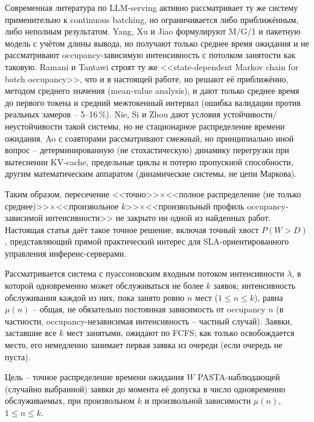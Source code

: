 \documentclass[12pt,a4paper]{article}
\newcommand{\articlesection}[1]{\par\vspace{14pt}{\bfseries #1}\par\vspace{6pt}\nopagebreak}
\begin{document}
Современная литература по LLM-serving активно рассматривает ту же систему применительно к continuous batching, но ограничивается либо приближённым, либо неполным результатом. Yang, Xu и Jiao \cite{yang2024} формулируют M/G/1 и пакетную модель с учётом длины вывода, но получают только среднее время ожидания и не рассматривают occupancy-зависимую интенсивность с потолком занятости как таковую. Ramani и Tantawi \cite{ramani2026} строят ту же <<state-dependent Markov chain for batch occupancy>>, что и в настоящей работе, но решают её приближённо, методом среднего значения (mean-value analysis), и дают только среднее время до первого токена и средний межтокенный интервал (ошибка валидации против реальных замеров -- 5--16\,\%). Nie, Si и Zhou \cite{nie2026} дают условия устойчивости/неустойчивости такой системы, но не стационарное распределение времени ожидания. Ao с соавторами \cite{ao2026} рассматривают смежный, но принципиально иной вопрос -- детерминированную (не стохастическую) динамику перегрузки при вытеснении KV-cache, предельные циклы и потерю пропускной способности, другим математическим аппаратом (динамические системы, не цепи Маркова).

Таким образом, пересечение <<точно>>$\times$<<полное распределение (не только среднее)>>$\times$<<произвольное $k$>>$\times$<<произвольный профиль occupancy-зависимой интенсивности>> не закрыто ни одной из найденных работ. Настоящая статья даёт такое точное решение, включая точный хвост $P(W>D)$, представляющий прямой практический интерес для SLA-ориентированного управления инференс-серверами.

\articlesection{Постановка задачи}

Рассматривается система с пуассоновским входным потоком интенсивности $\lambda$, в которой одновременно может обслуживаться не более $k$ заявок; интенсивность обслуживания каждой из них, пока занято ровно $n$ мест ($1\le n\le k$), равна $\mu(n)$ -- общая, не обязательно постоянная зависимость от occupancy $n$ (в частности, occupancy-независимая интенсивность -- частный случай). Заявки, заставшие все $k$ мест занятыми, ожидают по FCFS; как только освобождается место, его немедленно занимает первая заявка из очереди (если очередь не пуста).

Цель -- точное распределение времени ожидания $W$ PASTA-наблюдающей (случайно выбранной) заявки до момента её допуска в число одновременно обслуживаемых, при произвольном $k$ и произвольной зависимости $\mu(n)$, $1\le n\le k$.

\articlesection{Метод}
\end{document}
